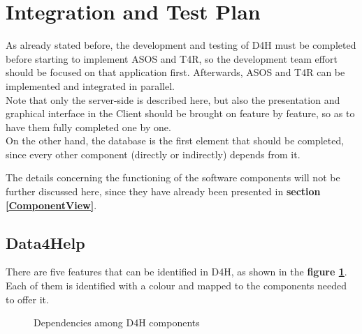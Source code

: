 \section{Integration and Test Plan}
As already stated before, the development and testing of D4H must be completed before starting to implement ASOS and T4R, so the development team effort should be focused on that application first. Afterwards, ASOS and T4R can be implemented and integrated in parallel. \\
Note that only the server-side is described here, but also the presentation and graphical interface in the Client should be brought on feature by feature, so as to have them fully completed one by one. \\
On the other hand, the database is the first element that should be completed, since every other component (directly or indirectly) depends from it.

The details concerning the functioning of the software components will not be further discussed here, since they have already been presented in \textbf{section \ref{ComponentView}}.

\subsection{Data4Help}
    There are five features that can be identified in D4H, as shown in the \textbf{figure \ref{fig:D4H_DependencyDiagram}}. Each of them is identified with a colour and mapped to the components needed to offer it.
    
    \begin{figure}[htbp]
        \centering
        \caption{Dependencies among D4H components}
        \label{fig:D4H_DependencyDiagram}
    \end{figure}
    
